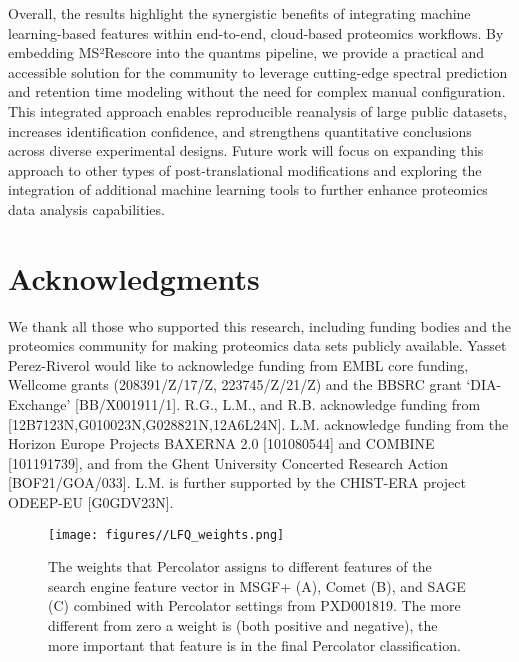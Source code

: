 \documentclass[12pt]{article}
\begin{document}
Overall, the results highlight the synergistic benefits of integrating machine learning-based features within end-to-end, cloud-based proteomics workflows. By embedding MS²Rescore into the quantms pipeline, we provide a practical and accessible solution for the community to leverage cutting-edge spectral prediction and retention time modeling without the need for complex manual configuration. This integrated approach enables reproducible reanalysis of large public datasets, increases identification confidence, and strengthens quantitative conclusions across diverse experimental designs. Future work will focus on expanding this approach to other types of post-translational modifications and exploring the integration of additional machine learning tools to further enhance proteomics data analysis capabilities. %

\section*{Acknowledgments}
We thank all those who supported this research, including funding bodies and the proteomics community for making proteomics data sets publicly available. 
Yasset Perez-Riverol would like to acknowledge funding from EMBL core funding, Wellcome grants (208391/Z/17/Z, 223745/Z/21/Z) and the BBSRC grant ‘DIA-Exchange’ [BB/X001911/1].
R.G., L.M., and R.B. acknowledge funding from [12B7123N,G010023N,G028821N,12A6L24N]. L.M. acknowledge funding from the Horizon Europe Projects BAXERNA 2.0 [101080544] and COMBINE [101191739], and from the Ghent University Concerted Research Action [BOF21/GOA/033]. L.M. is further supported by the CHIST-ERA project ODEEP-EU [G0GDV23N].



\renewcommand\thefigure{S\arabic{figure}}
\setcounter{figure}{0}

\begin{figure}[ht!]
	\centering
	\texttt{[image: figures//LFQ\_weights.png]}
	\caption{The weights that Percolator assigns to different features of the search engine feature vector in MSGF+ (A), Comet (B), and SAGE (C) combined with Percolator settings from PXD001819. The more different from zero a weight is (both positive and negative), the more important that feature is in the final Percolator classification.}
	\label{fig:PXD001819_svm_weights}
\end{figure}
\end{document}

